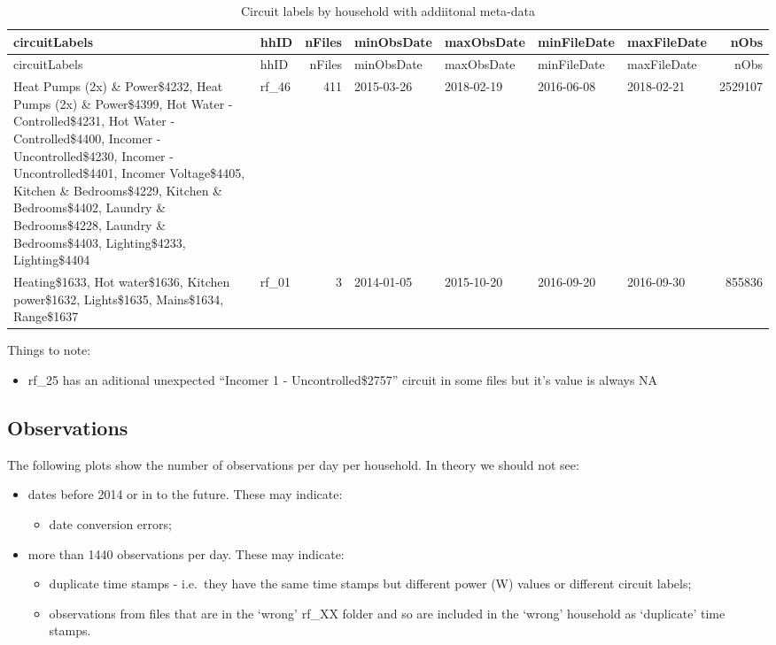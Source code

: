 \documentclass[]{article}
\providecommand{\tightlist}{%
  \setlength{\itemsep}{0pt}\setlength{\parskip}{0pt}}
\begin{document}
\begin{longtable}[]{@{}llrllllr@{}}
\caption{Circuit labels by household with addiitonal
meta-data}\tabularnewline
\toprule
circuitLabels & hhID & nFiles & minObsDate & maxObsDate & minFileDate &
maxFileDate & nObs\tabularnewline
\midrule
\endfirsthead
\toprule
circuitLabels & hhID & nFiles & minObsDate & maxObsDate & minFileDate &
maxFileDate & nObs\tabularnewline
\midrule
\endhead
Heat Pumps (2x) \& Power\$4232, Heat Pumps (2x) \& Power\$4399, Hot
Water - Controlled\$4231, Hot Water - Controlled\$4400, Incomer -
Uncontrolled\$4230, Incomer - Uncontrolled\$4401, Incomer Voltage\$4405,
Kitchen \& Bedrooms\$4229, Kitchen \& Bedrooms\$4402, Laundry \&
Bedrooms\$4228, Laundry \& Bedrooms\$4403, Lighting\$4233,
Lighting\$4404 & rf\_46 & 411 & 2015-03-26 & 2018-02-19 & 2016-06-08 &
2018-02-21 & 2529107\tabularnewline
Heating\$1633, Hot water\$1636, Kitchen power\$1632, Lights\$1635,
Mains\$1634, Range\$1637 & rf\_01 & 3 & 2014-01-05 & 2015-10-20 &
2016-09-20 & 2016-09-30 & 855836\tabularnewline
\bottomrule
\end{longtable}

Things to note:

\begin{itemize}
\tightlist
\item
  rf\_25 has an aditional unexpected ``Incomer 1 - Uncontrolled\$2757''
  circuit in some files but it's value is always NA
\end{itemize}

\subsection{Observations}\label{observations}

The following plots show the number of observations per day per
household. In theory we should not see:

\begin{itemize}
\tightlist
\item
  dates before 2014 or in to the future. These may indicate:

  \begin{itemize}
  \tightlist
  \item
    date conversion errors;
  \end{itemize}
\item
  more than 1440 observations per day. These may indicate:

  \begin{itemize}
  \tightlist
  \item
    duplicate time stamps - i.e.~they have the same time stamps but
    different power (W) values or different circuit labels;
  \item
    observations from files that are in the `wrong' rf\_XX folder and so
    are included in the `wrong' household as `duplicate' time stamps.
  \end{itemize}
\end{itemize}
\end{document}
